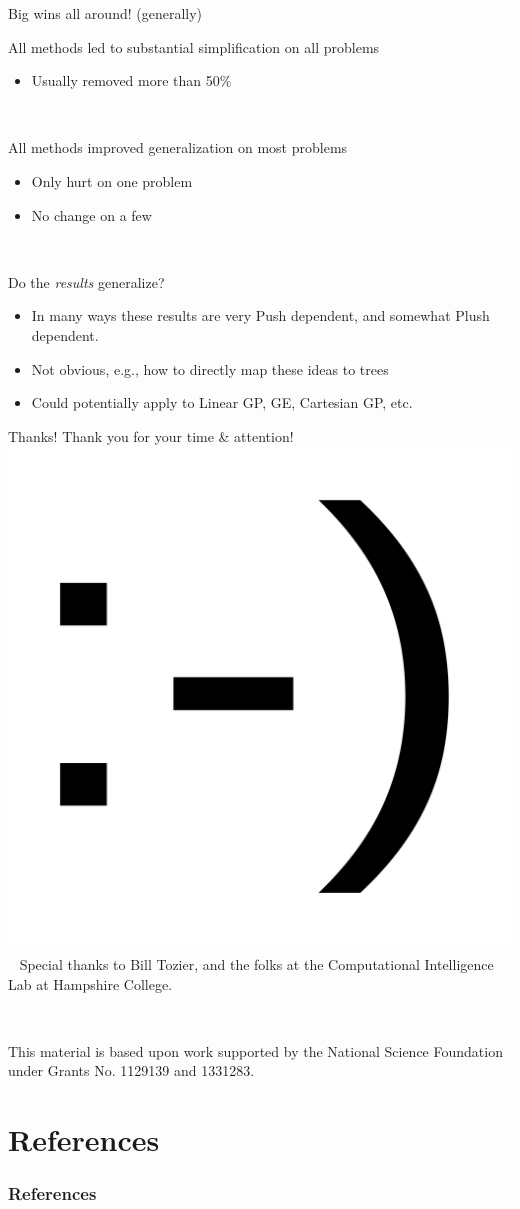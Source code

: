 \documentclass{beamer}
\begin{document}
\begin{frame}{Big wins all around! (generally)}

All methods led to substantial simplification on all problems
\begin{itemize}
	\item Usually removed more than 50\%
\end{itemize}

~

All methods improved generalization on most problems
\begin{itemize}
	\item Only hurt on one problem
	\item No change on a few
\end{itemize}

~

Do the \emph{results} generalize?
\begin{itemize}
	\item In many ways these results are very Push dependent, and somewhat Plush dependent.
	\item Not obvious, e.g., how to directly map these ideas to trees
	\item Could potentially apply to Linear GP, GE, Cartesian GP, etc.
\end{itemize}


\end{frame}

\begin{frame}{Thanks!}
\center \Large
Thank you for your time \& attention! \\ \medskip
\includegraphics[width=.1\textwidth]{Illustrations/smile.png} \\ \medskip
\normalsize
~
Special thanks to Bill Tozier, and the folks at the Computational Intelligence Lab at Hampshire College.

~

This material is based upon work supported by the National Science Foundation under 
Grants No. 1129139 and 1331283.

\end{frame}


\section*{References}

\begin{frame}[allowframebreaks]
\frametitle{References}


\end{frame}
\end{document}
